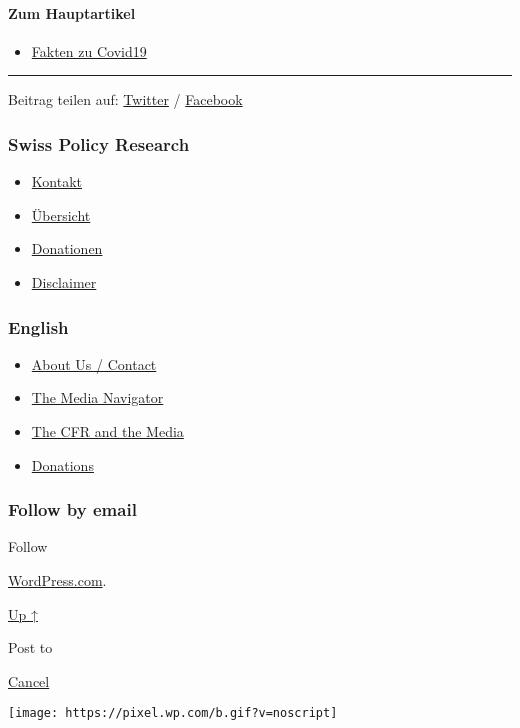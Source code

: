 \hypertarget{zum-hauptartikel}{%
\paragraph{Zum Hauptartikel}\label{zum-hauptartikel}}

\begin{itemize}
\tightlist
\item
  \href{https://swprs.org/covid-19-hinweis-ii/}{Fakten zu Covid19}
\end{itemize}

\begin{center}\rule{0.5\linewidth}{\linethickness}\end{center}

Beitrag teilen auf:
\href{https://twitter.com/intent/tweet?url=https://swprs.org/rki-relativiert-corona-todesfaelle/}{Twitter}
/
\href{https://www.facebook.com/share.php?u=https://swprs.org/rki-relativiert-corona-todesfaelle/}{Facebook}

\hypertarget{swiss-policy-research}{%
\subsubsection{Swiss Policy Research}\label{swiss-policy-research}}

\begin{itemize}
\tightlist
\item
  \href{https://swprs.org/kontakt/}{Kontakt}
\item
  \href{https://swprs.org/uebersicht/}{Übersicht}
\item
  \href{https://swprs.org/donationen/}{Donationen}
\item
  \href{https://swprs.org/disclaimer/}{Disclaimer}
\end{itemize}

\hypertarget{english}{%
\subsubsection{English}\label{english}}

\begin{itemize}
\tightlist
\item
  \href{https://swprs.org/contact/}{About Us / Contact}
\item
  \href{https://swprs.org/media-navigator/}{The Media Navigator}
\item
  \href{https://swprs.org/the-american-empire-and-its-media/}{The CFR
  and the Media}
\item
  \href{https://swprs.org/donations/}{Donations}
\end{itemize}

\hypertarget{follow-by-email}{%
\subsubsection{Follow by email}\label{follow-by-email}}

Follow

\href{https://wordpress.com/?ref=footer_custom_com}{WordPress.com}.

\protect\hyperlink{}{Up ↑}

Post to

\protect\hyperlink{}{Cancel}

\texttt{[image: https://pixel.wp.com/b.gif?v=noscript]}
